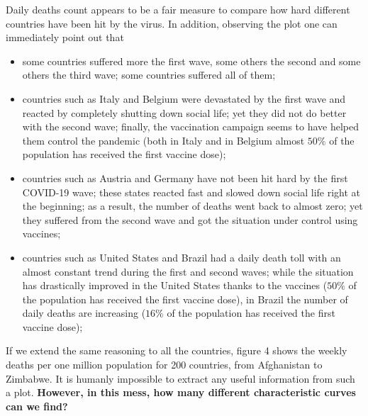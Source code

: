 \documentclass[11pt,a4paper]{article}
\begin{document}
\noindent
Daily deaths count appears to be a fair measure to compare how hard different
countries have been hit by the virus. In addition, observing the plot one can
immediately point out that
\begin{itemize}
    \item some countries suffered more the first wave, some others the second
    and some others the third wave; some countries suffered all of them;
    \item countries such as {\color{ts_italy}Italy} and
    {\color{ts_belgium}Belgium} were devastated by the first wave and reacted
    by completely shutting down social life; yet they did not do better with the
    second wave; finally, the vaccination campaign seems to have helped them
    control the pandemic (both in {\color{ts_italy}Italy} and
    in {\color{ts_belgium}Belgium} almost $50\%$ of the population has received
    the first vaccine dose);
    \item countries such as {\color{ts_austria}Austria} and
    {\color{ts_germany}Germany} have not been hit hard by the first COVID-19
    wave; these states reacted fast and slowed down social life right at the
    beginning; as a result, the number of deaths went back to almost zero; yet
    they suffered from the second wave and got the situation under control using
    vaccines;
    \item countries such as {\color{ts_unitedstates}United States} and
    {\color{cyan}Brazil} had a daily death toll with an almost constant
    trend during the first and second waves; while the situation has drastically
    improved in the {\color{ts_unitedstates}United States} thanks to the
    vaccines ($50\%$ of the population has received
    the first vaccine dose), in {\color{cyan}Brazil} the number of daily deaths
    are increasing ($16\%$ of the population has received the first vaccine
    dose);
\end{itemize}
If we extend the same reasoning to all the countries, figure 4 shows the weekly
deaths per one million population for 200 countries, from Afghanistan to
Zimbabwe. It is humanly impossible to extract any useful information from such a
plot. \textbf{However, in this mess, how many different characteristic curves
can we find?}
\end{document}
